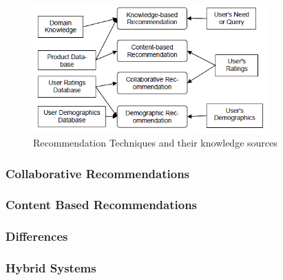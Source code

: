 \begin{figure}[htb]
\centering
\includegraphics[width=0.8\textwidth]{Images/RecTypes.png}
\caption{Recommendation Techniques and their knowledge sources}
\label{RecTypes}
\end{figure}

\subsubsection{Collaborative Recommendations} 
\label{Collaborative} 

\subsubsection{Content Based Recommendations} 
\label{ContentBased} 

\subsubsection{Differences}
\label{Differences} 

\subsubsection{Hybrid Systems} 
\label{Hybrid} 
